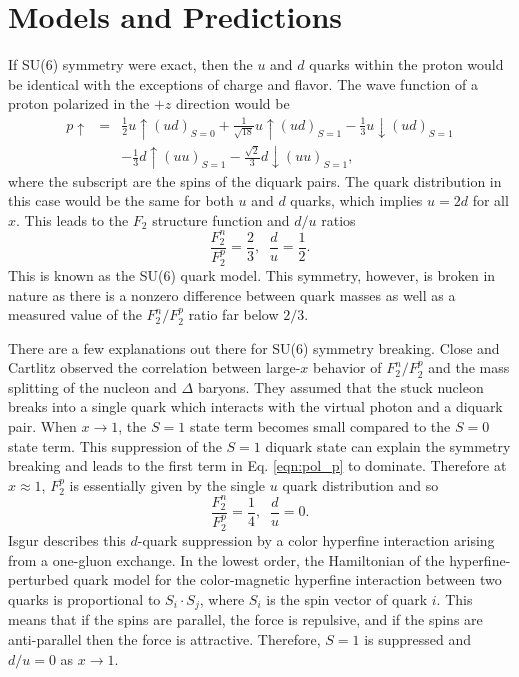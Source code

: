 \section{Models and Predictions}
If SU(6) symmetry were exact, then the $u$ and $d$ quarks within the proton would be identical with the exceptions of charge and flavor. The wave function of a proton polarized in the $+z$ direction \cite{book:close} would be
\begin{eqnarray}
\label{eqn:pol_p}
\nonumber
p \uparrow &=& \frac{1}{2}u\uparrow(ud)_{S=0} + \frac{1}{\sqrt{18}}u\uparrow (ud)_{S=1} - \frac{1}{3}u\downarrow(ud)_{S=1} \\
&&- \frac{1}{3}d\uparrow(uu)_{S=1} - \frac{\sqrt{2}}{3}d\downarrow(uu)_{S=1},
\end{eqnarray}
where the subscript are the spins of the diquark pairs. The quark distribution in this case would be the same for both $u$ and $d$ quarks, which implies $u=2d$ for all $x$. This leads to the $F_2$ structure function and $d/u$ ratios
\begin{equation}
\frac{F_2^n}{F_2^p}  = \frac{2}{3}, \; \; \frac{d}{u} = \frac{1}{2}.
\end{equation}
This is known as the SU(6) quark model. This symmetry, however, is broken in nature as there is a nonzero difference between quark masses as well as a measured value of the $F_2^n/F_2^p$ ratio far below $2/3$.

There are a few explanations out there for SU(6) symmetry breaking. Close \cite{physrep:close} and Cartlitz \cite{physrep:carlitz} observed the correlation between large-$x$ behavior of $F_2^n/F_2^p$ and the mass splitting of the nucleon and $\Delta$ baryons. They assumed that the stuck nucleon breaks into a single quark which interacts with the virtual photon and a diquark pair. When $x \rightarrow 1$, the $S=1$ state term becomes small compared to the $S=0$ state term. This suppression of the $S=1$ diquark state can explain the symmetry breaking and leads to the first term in Eq. \ref{eqn:pol_p} to dominate. Therefore at $x\approx 1$, $F_2^p$ is essentially given by the single $u$ quark distribution and so
\begin{equation}
\frac{F_2^n}{F_2^p}  = \frac{1}{4}, \; \; \frac{d}{u} =0.
\end{equation}
Isgur \cite{physrep:insgur1} \cite{physrep:insgur2} describes this $d$-quark suppression by a color hyperfine interaction arising from a one-gluon exchange. In the lowest order, the Hamiltonian of the hyperfine-perturbed quark model for the color-magnetic hyperfine interaction between two quarks is proportional to $S_i \cdot S_j$, where $S_i$ is the spin vector of quark $i$. This means that if the spins are parallel, the force is repulsive, and if the spins are anti-parallel then the force is attractive. Therefore, $S=1$ is suppressed and $d/u =0$ as $x \rightarrow 1$.

